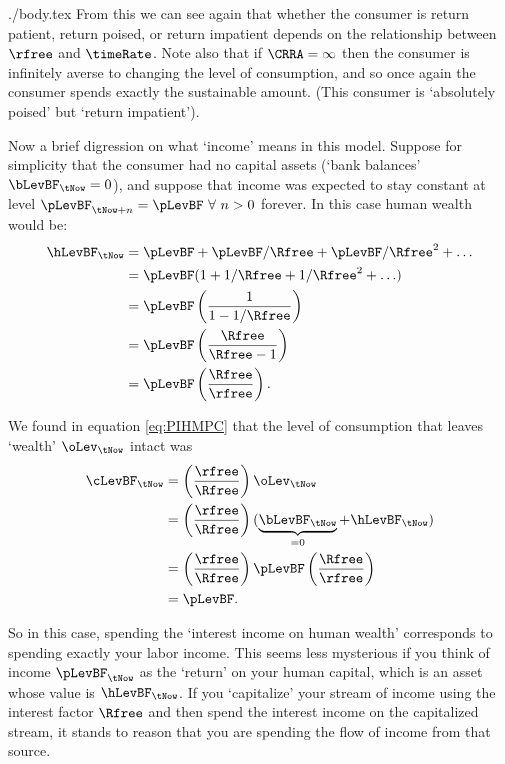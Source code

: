 \documentclass{handout}
\begin{document}
\begin{verbatimwrite}{./body.tex}
From this we can see again that whether the consumer is return patient, return poised, or return impatient
depends on the relationship between $\rfree$ and $\timeRate$.  Note also that 
if $\CRRA = \infty$ then the consumer is infinitely averse to changing 
the level of consumption, and so once again the consumer spends 
exactly the sustainable amount.  (This consumer is `absolutely poised' but `return impatient').


Now a  brief digression on what `income' means in this model.  Suppose
for simplicity that the consumer had no capital assets (`bank balances' $\bLevBF_{\tNow}=0$), and suppose
that income was expected to stay constant at level $\pLevBF_{\tNow+n}=\pLevBF~\forall~n>0$ forever.
In this case human wealth would be:
\begin{equation*}
  \begin{gathered}
    \begin{aligned}
        \hLevBF_{\tNow} & = \pLevBF+\pLevBF/\Rfree+\pLevBF/\Rfree^{2}+\ldots  \\
         & = \pLevBF(1+1/\Rfree+1/\Rfree^{2}+\ldots)  \\
         & = \pLevBF\left(\frac{1}{1-1/\Rfree}\right)
\\   & = \pLevBF\left(\frac{\Rfree}{\Rfree -1}\right)
\\   & = \pLevBF\left(\frac{\Rfree}{\rfree}\right)
.
\end{aligned}
\end{gathered}
\end{equation*}


We found in equation \eqref{eq:PIHMPC} that 
the level of consumption that leaves `wealth' $\oLev_{\tNow}$ intact
was
\begin{equation}\begin{gathered}\begin{aligned}
        \cLevBF_{\tNow} & =  \left(\frac{\rfree}{\Rfree}\right) \oLev_{\tNow}  \\
         & =  \left(\frac{\rfree}{\Rfree}\right) (\underbrace{\bLevBF_{\tNow}}_{=0}+\hLevBF_{\tNow}) \\
                        & =  \left(\frac{\rfree}{\Rfree}\right)     \pLevBF \left(\frac{\Rfree}{\rfree}\right)\\
                        & =  \pLevBF.
\end{aligned}\end{gathered}\end{equation}

So in this case, spending the `interest income on human wealth' 
corresponds to spending exactly your labor income.  This seems less 
mysterious if you think of income $\pLevBF_{\tNow}$ as the `return' on your 
human capital, which is an asset whose value is $\hLevBF_{\tNow}$.  If you `capitalize' your stream of 
income using the interest factor $\Rfree$ and then spend the interest income on the 
capitalized stream, it stands to reason that you are spending the flow 
of income from that source.


\end{verbatimwrite}
\end{document}
